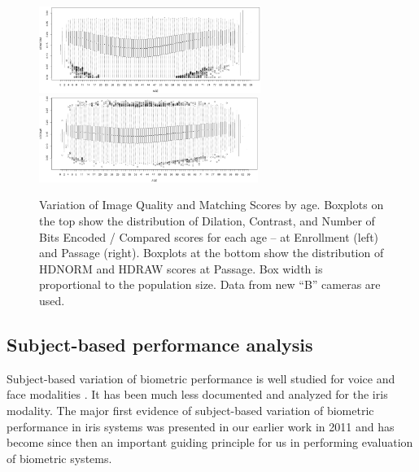 \documentclass{cta-author}%
\begin{document}
\begin{figure}[!t]
\vspace{5pt}

\includegraphics[width=0.5\linewidth,height=1.1in]{eps/HDNORM.eps}\quad
\includegraphics[width=0.5\linewidth,height=1.1in]{eps/HDRAW.eps} 
\caption{Variation of Image Quality and Matching Scores by age.  
Boxplots on the top show  the distribution of Dilation, Contrast, and Number of Bits Encoded / Compared scores for each age --
at Enrollment (left) and  Passage (right). Boxplots at the bottom show  the distribution of HDNORM and  HDRAW scores at Passage.
Box width is proportional to the population size. 
Data from new ``B'' cameras are used. 
\label{fHDpassage}}
\end{figure}




\subsection{Subject-based performance analysis }
\label{s.s-b}



Subject-based variation of biometric performance
is well studied for voice and face modalities \cite{Doddington,Poh}. It has been much less documented and analyzed for the iris modality.  
The major first evidence of subject-based variation of biometric performance in iris systems 
was presented in our earlier work in 2011 \cite{Gorodnichy2011} and has become since then an important guiding principle for us in performing evaluation of biometric systems.
\end{document}
